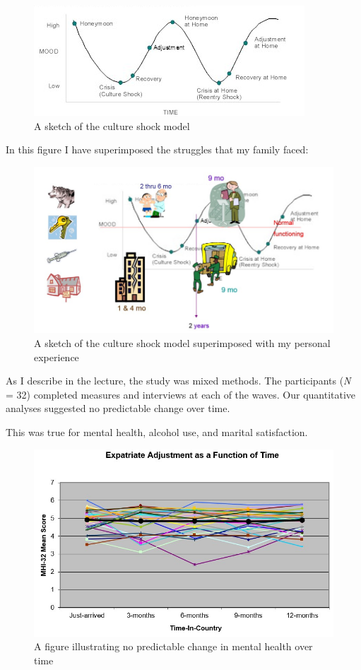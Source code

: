 \documentclass[
  english,
]{book}
\begin{document}
\begin{figure}
\centering
\includegraphics{images/Qualitative/Wcurve.png}
\caption{A sketch of the culture shock model}
\end{figure}

In this figure I have superimposed the struggles that my family faced:

\begin{figure}
\centering
\includegraphics{images/Qualitative/myWcurve.jpg}
\caption{A sketch of the culture shock model superimposed with my personal experience}
\end{figure}

As I describe in the lecture, the study was mixed methods. The participants (\emph{N} = 32) completed measures and interviews at each of the waves. Our quantitative analyses suggested no predictable change over time.

This was true for mental health, alcohol use, and marital satisfaction.

\begin{figure}
\centering
\includegraphics{images/Qualitative/expatMHI.jpg}
\caption{A figure illustrating no predictable change in mental health over time}
\end{figure}
\end{document}
